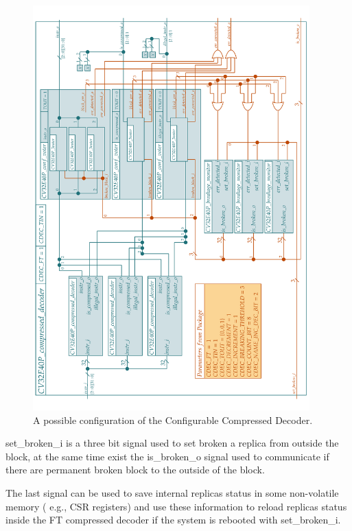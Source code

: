 {{{    		
    	    \begin{figure}[H]
        		\centering
        		\includegraphics[width=0.95\textwidth,center]{./images/cv32e40p_compressed_decoder_ft.png}
        		\caption{A possible configuration of the Configurable Compressed Decoder.}
        		\label{fig:cv32e40p_compressed_decoder_ft}
        	\end{figure} 	
        	 
        	 set\_broken\_i is a three bit signal used to set broken a replica from outside the block, at the same time exist the is\_broken\_o signal used to communicate if there are permanent broken block to the outside of the block.
        	 
        	 The last signal can be used to save internal replicas status in some non-volatile memory ( e.g., CSR registers) and use these information to reload replicas status inside the FT compressed decoder if the system is rebooted with set\_broken\_i.\\
        	 
}}}
